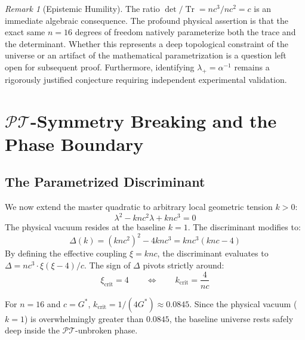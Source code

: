 \documentclass[12pt]{article}
\newcommand{\PT}{\mathcal{PT}}
\DeclareMathOperator{\Tr}{Tr}
\theoremstyle{definition}
\theoremstyle{remark}
\newtheorem{remark}{Remark}[section]
\begin{document}
\begin{remark}[Epistemic Humility]
The ratio $\det/\Tr = nc^3/nc^2 = c$ is an immediate algebraic consequence. The profound physical assertion is that the exact same $n = 16$ degrees of freedom natively parameterize both the trace and the determinant. Whether this represents a deep topological constraint of the universe or an artifact of the mathematical parametrization is a question left open for subsequent proof. Furthermore, identifying $\lambda_+ = \alpha^{-1}$ remains a rigorously justified conjecture requiring independent experimental validation.
\end{remark}

\section{$\PT$-Symmetry Breaking and the Phase Boundary}
\label{sec:pt}

\subsection{The Parametrized Discriminant}

We now extend the master quadratic to arbitrary local geometric tension $k > 0$:
\begin{equation}
\label{eq:general_quadratic}
    \lambda^2 - knc^2\lambda + knc^3 = 0
\end{equation}
The physical vacuum resides at the baseline $k = 1$. The discriminant modifies to:
\begin{equation}
\label{eq:discriminant}
    \Delta(k) = (knc^2)^2 - 4knc^3 = knc^3(knc - 4)
\end{equation}
By defining the effective coupling $\xi = knc$, the discriminant evaluates to $\Delta = nc^3 \cdot \xi(\xi - 4)/c$. The sign of $\Delta$ pivots strictly around:
\begin{equation}
    \xi_{\text{crit}} = 4 \qquad \Longleftrightarrow \qquad k_{\text{crit}} = \frac{4}{nc}
\end{equation}

For $n = 16$ and $c = G^{*}$, $k_{\text{crit}} = 1/(4G^{*}) \approx 0.0845$. Since the physical vacuum ($k = 1$) is overwhelmingly greater than $0.0845$, the baseline universe rests safely deep inside the $\PT$-unbroken phase.
\end{document}
